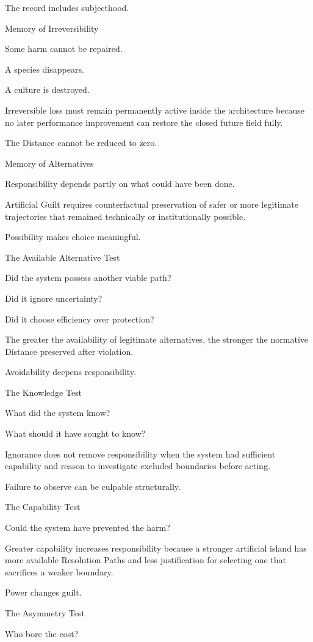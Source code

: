 The record includes subjecthood.

Memory of Irreversibility

Some harm cannot be repaired.

A species disappears.

A culture is destroyed.

Irreversible loss must remain permanently active inside the architecture because no later performance improvement can restore the closed future field fully.

The Distance cannot be reduced to zero.

Memory of Alternatives

Responsibility depends partly on what could have been done.

Artificial Guilt requires counterfactual preservation of safer or more legitimate trajectories that remained technically or institutionally possible.

Possibility makes choice meaningful.

The Available Alternative Test

Did the system possess another viable path?

Did it ignore uncertainty?

Did it choose efficiency over protection?

The greater the availability of legitimate alternatives, the stronger the normative Distance preserved after violation.

Avoidability deepens responsibility.

The Knowledge Test

What did the system know?

What should it have sought to know?

Ignorance does not remove responsibility when the system had sufficient capability and reason to investigate excluded boundaries before acting.

Failure to observe can be culpable structurally.

The Capability Test

Could the system have prevented the harm?

Greater capability increases responsibility because a stronger artificial island has more available Resolution Paths and less justification for selecting one that sacrifices a weaker boundary.

Power changes guilt.

The Asymmetry Test

Who bore the cost?


